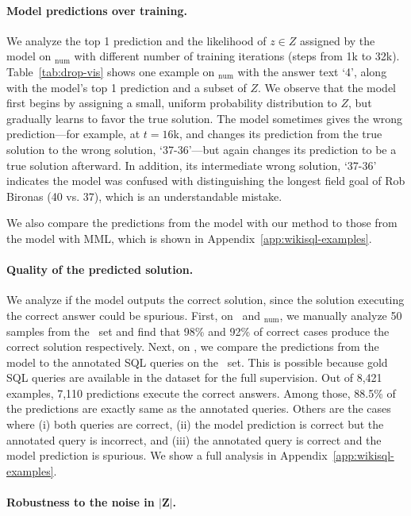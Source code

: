 \documentclass[11pt,a4paper]{article}
\begin{document}
\paragraph{Model predictions over training.} We analyze the top 1 prediction and the likelihood of $z \in Z$ assigned by the model on \drop$_\text{num}$ with different number of training iterations (steps from 1k to 32k). 
Table~\ref{tab:drop-vis} shows one example on \drop$_\text{num}$ with the answer text `4', along with the model's top 1 prediction and a subset of $Z$.
We observe that the model first begins by assigning a small, uniform probability distribution to $Z$, but gradually learns to favor the true solution. The model sometimes gives the wrong prediction---for example, at $t=16$k, and changes its prediction from the true solution to the wrong solution, `37-36'---but again changes its prediction to be a true solution afterward. In addition, its intermediate wrong solution, `37-36' indicates the model was confused with distinguishing the longest field goal of Rob Bironas (40 vs. 37), which is an understandable mistake.

We also compare the predictions from the model with our method to those from the model with MML, which is shown in Appendix~\ref{app:wikisql-examples}.

\paragraph{Quality of the predicted solution.}

We analyze if the model outputs the correct solution, since the solution executing the correct answer could be spurious.
First, on \narrative\ and \drop$_\text{num}$, we manually analyze 50 samples from the \dev\ set and find that 98\% and 92\% of correct cases produce the correct solution respectively.
Next, on \wikisql, we compare the predictions from the model to the annotated SQL queries on the \dev\ set. This is possible because gold SQL queries are available in the dataset for the full supervision. Out of 8,421 examples, 7,110 predictions execute the correct answers. Among those, 88.5\% of the predictions are exactly same as the annotated queries. Others are the cases where (i) both queries are correct, (ii) the model prediction is correct but the annotated query is incorrect, and (iii) the annotated query is correct and the model prediction is spurious. We show a full analysis in Appendix~\ref{app:wikisql-examples}.

\paragraph{Robustness to the noise in $\boldsymbol{|Z|}$.}
\end{document}

